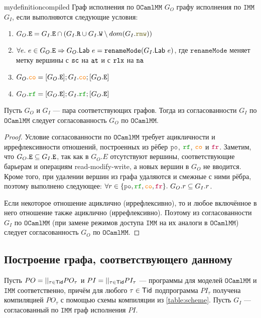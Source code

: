 \documentclass[14pt]{matmex-diploma-custom}
\newcommand{\IMM}{\mathtt{IMM}}
\newcommand{\OMM}{\mathtt{OCaml}\allowbreak \mathtt{MM}}
\begin{document}
\begin{restatable}{mydefinition}{compiled}
  Граф исполнения по $\OMM$ $G_O$  графу исполнения по $\IMM$ $G_I$, если выполняются следующие условия:
  \begin{enumerate}
  \item $G_O.\lE = G_I.\lE \cap (G_I.\lR \cup G_I.\lW \setminus dom(G_I.\lRMW))$
  \item $\forall e.\ e \in G_O.{\mathtt{E}} \Rightarrow G_O.\mathsf{Lab}\ e = \mathtt{renameMode}(G_I.\mathsf{Lab}\ e)$, где $\mathtt{renameMode}$ меняет метку вершины с ${\mathtt{sc}}$ на ${\mathtt{at}}$ и с $\mathtt{rlx}$ на ${\mathtt{na}}$
  \item $G_O.\lCO = [G_O.\lE]; G_I.\lCO; [G_O.\lE]$
  \item $G_O.\lRF = [G_O.\lE]; G_I.\lRF; [G_O.\lE]$
  \end{enumerate}
\end{restatable}

\begin{theorem} \label{graph-replacement}
  Пусть $G_O$ и $G_I$ --- пара соответствующих графов. Тогда из согласованности $G_I$ по $\OMM$ следует согласованность $G_O$ по $\OMM$. 
\end{theorem}
\begin{proof}
  Условие согласованности по $\OMM$ требует ацикличности и иррефлексивности отношений, построенных из рёбер $\lPO$, $\lRF$, $\lCO$ и $\lFR$. Заметим, что $G_O.{\mathtt{E}} \subseteq G_I.{\mathtt{E}}$, так как в $G_O.E$ отсутствуют вершины, соответствующие барьерам и операциям read-modify-write, а новых вершин в $G_O$ не вводится. Кроме того, при удалении вершин из графа удаляются и смежные с ними рёбра, поэтому выполнено следующее: $\forall r \in \set{\lPO, \lRF, \lCO, \lFR}.\ G_O.r \subseteq G_I.r$.

  Если некоторое отношение ациклично (иррефлексивно), то и любое включённое в него отношение также ациклично (иррефлексивно). Поэтому из согласованности $G_I$ по $\OMM$ (при замене режимов доступа $\IMM$ на их аналоги в $\OMM$) следует согласованность $G_O$ по $\OMM$.
\end{proof}

\subsection{Построение графа, соответствующего данному}

Пусть $PO=||_{\tau\in \mathsf{Tid}} PO_\tau$ и $PI=||_{\tau\in \mathsf{Tid}} PI_\tau$ --- программы для моделей $\OMM$ и $\IMM$ соответственно, причём для любого $\tau \in \mathsf{Tid}$ подпрограмма $PI_\tau$ получена компиляцией $PO_\tau$ с помощью схемы компиляции из \cref{table:scheme}. Пусть $G_I$ --- согласованный по $\IMM$ граф исполнения $PI$.
\end{document}
